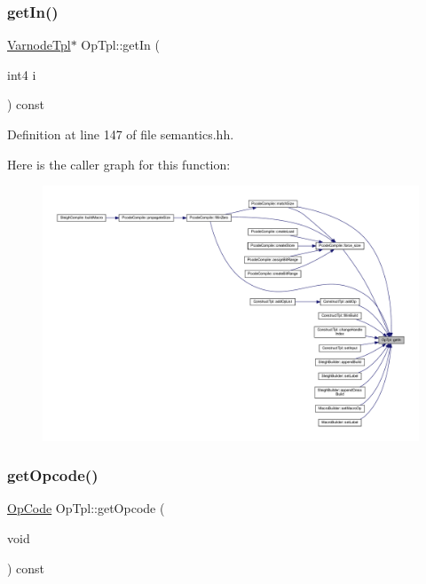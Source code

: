\subsubsection{\texorpdfstring{getIn()}{getIn()}}
{\footnotesize\ttfamily \mbox{\hyperlink{class_varnode_tpl}{Varnode\+Tpl}}$\ast$ Op\+Tpl\+::get\+In (\begin{DoxyParamCaption}\item[{int4}]{i }\end{DoxyParamCaption}) const\hspace{0.3cm}{\ttfamily [inline]}}



Definition at line 147 of file semantics.\+hh.

Here is the caller graph for this function\+:
\nopagebreak
\begin{figure}[H]
\begin{center}
\leavevmode
\includegraphics[width=350pt]{class_op_tpl_ab554689cf37b6c0e96ba118835f06011_icgraph}
\end{center}
\end{figure}
\mbox{\label{class_op_tpl_aa553f6070fcf500f8d24af5f8e9f5da2}} 
\subsubsection{\texorpdfstring{getOpcode()}{getOpcode()}}
{\footnotesize\ttfamily \mbox{\hyperlink{opcodes_8hh_abeb7dfb0e9e2b3114e240a405d046ea7}{Op\+Code}} Op\+Tpl\+::get\+Opcode (\begin{DoxyParamCaption}\item[{void}]{ }\end{DoxyParamCaption}) const\hspace{0.3cm}{\ttfamily [inline]}}



